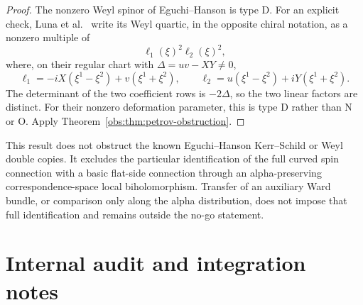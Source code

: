 \documentclass[11pt]{article}
\theoremstyle{definition}
\theoremstyle{remark}
\begin{document}
\begin{proof}
The nonzero Weyl spinor of Eguchi--Hanson is type D. For an explicit check,
Luna et al.~\cite[Section 5.1, equation (5.8)]{LMNO} write its Weyl quartic,
in the opposite chiral notation, as a nonzero multiple of
\[
 \ell_1(\xi)^2\ell_2(\xi)^2,
\]
where, on their regular chart with $\Delta=uv-XY\ne0$,
\[
 \ell_1=-iX(\xi^1-\xi^2)+v(\xi^1+\xi^2),\qquad
 \ell_2=u(\xi^1-\xi^2)+iY(\xi^1+\xi^2).
\]
The determinant of the two coefficient rows is $-2\Delta$, so the two
linear factors are distinct. For their nonzero deformation parameter,
this is type D rather than N or O. Apply
Theorem~\ref{obs:thm:petrov-obstruction}.
\end{proof}

This result does not obstruct the known Eguchi--Hanson Kerr--Schild or Weyl
double copies. It excludes the particular identification of the full
curved spin connection with a basic flat-side connection through an
alpha-preserving correspondence-space local biholomorphism. Transfer of
an auxiliary Ward bundle, or comparison only along the alpha distribution,
does not impose that full identification and remains outside the no-go
statement.

\section{Internal audit and integration notes}
\end{document}
